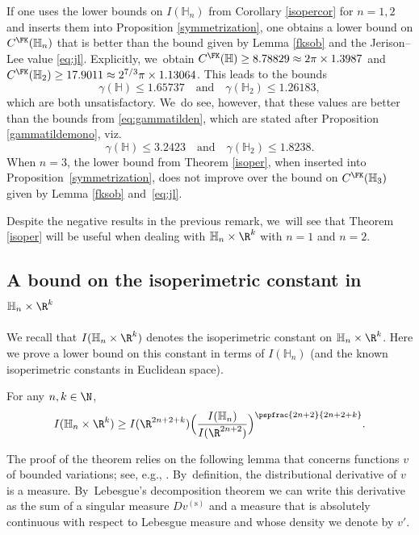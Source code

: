 \begin{remark}
If one uses the lower bounds on $I(\mathbb H_n)$ from Corollary \ref{isopercor} for $n=1,2$ and inserts them into Proposition \ref{symmetrization}, one obtains a lower bound on $C^\FK(\mathbb H_n)$ that is better than the bound given by Lemma \ref{fksob} and the Jerison--Lee value \eqref{eq:jl}. Explicitly, we~obtain $C^\FK(\mathbb H) \geq 8.78829 \approx 2\pi \times 1.3987$ and $C^\FK(\mathbb H_2) \geq 17.9011 \approx 2^{7/3} \pi \times 1.13064$. This leads to the bounds
\[
\gamma(\mathbb H) \leq 1.65737
\quad\text{and}\quad
\gamma(\mathbb H_2) \leq 1.26183,
\]
which are both unsatisfactory. We~do see, however, that these values are better than the bounds from \eqref{eq:gammatilden}, which are stated after Proposition \ref{gammatildemono}, viz.
\[
\gamma(\mathbb H) \leq 3.2423
\quad\text{and}\quad
\gamma(\mathbb H_2) \leq 1.8238.
\]
When $n=3$, the lower bound from Theorem \ref{isoper}, when inserted into Proposition~\ref{symmetrization}, does not improve over the bound on $C^\FK(\mathbb H_3)$ given by Lemma \ref{fksob} and~\eqref{eq:jl}.
\end{remark}

Despite the negative results in the previous remark, we~will see that Theorem \ref{isoper} will be useful when dealing with $\mathbb H_n\times\R^k$ with $n=1$ and $n=2$.

\subsection{A bound on the isoperimetric constant in $\mathbb H_n\times\R^k$}\label{sec:maincompn12}
We recall that $I(\mathbb H_n\times\nobreak\R^k)$ denotes the isoperimetric constant on $\mathbb H_n\times\R^k$. Here we prove a lower bound on this constant in terms of $I(\mathbb H_n)$ (and the known isoperimetric constants in Euclidean space).

\begin{theorem}\label{isoperk}
For any $n,k\in\N$,
\[
I(\mathbb H_n\times\R^k) \geq I(\R^{2n+2+k}) \Bigl(\frac{I(\mathbb H_n)}{I(\R^{2n+2})}\Bigr)^\pspfrac{2n+2}{2n+2+k}.
\]
\end{theorem}

The proof of the theorem relies on the following lemma that concerns functions $v$ of bounded variations; see, e.g., \cite[Chap.\,2 \& 7]{Leo}. By~definition, the distributional derivative of $v$ is a measure. By~Lebesgue's decomposition theorem we can write this derivative as the sum of a singular measure $Dv^{(\mathrm{s})}$ and a measure that is absolutely continuous with respect to Lebesgue measure and whose density we denote by $v'$.

